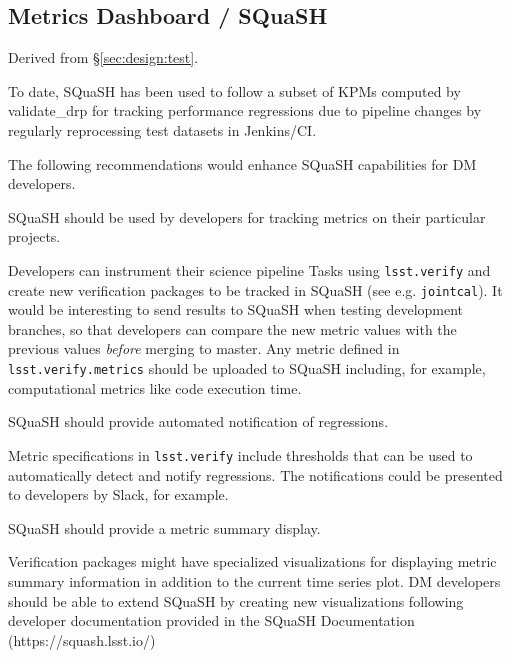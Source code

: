 \subsection{Metrics Dashboard / SQuaSH}

Derived from \S\ref{sec:design:test}.


To date, SQuaSH has been used to follow a subset of KPMs computed by validate\_drp for tracking performance regressions due to pipeline changes by regularly reprocessing test datasets in Jenkins/CI.

The following recommendations would enhance SQuaSH capabilities for DM developers.

\begin{recommendation}
SQuaSH should be used by developers for tracking metrics on their particular projects.
\end{recommendation}

Developers can instrument their science pipeline Tasks using \texttt{lsst.verify} and create new verification packages to be tracked in SQuaSH (see e.g. \texttt{jointcal}). It would be interesting to send results to SQuaSH when testing development branches, so that developers can compare the new metric values with the previous values \textit{before} merging to master. Any metric defined in \texttt{lsst.verify.metrics} should be uploaded to SQuaSH including, for example, computational metrics like code execution time.

\begin{recommendation}
SQuaSH should provide automated notification of regressions.
\end{recommendation}

Metric specifications in \texttt{lsst.verify} include thresholds that can be used to automatically detect and notify regressions. The notifications could be presented to developers by Slack, for example.

\begin{recommendation}
SQuaSH should provide a metric summary display.
\end{recommendation}

Verification packages might have specialized visualizations for displaying metric summary information in addition to the current time series plot. DM developers should be able to extend SQuaSH by creating new visualizations following developer documentation provided in the SQuaSH Documentation (https://squash.lsst.io/)

